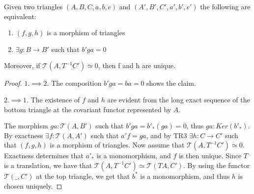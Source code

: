     \begin{lemma}
        Given two triangles $(A,B,C,a,b,c)$ and $(A',B',C',a',b',c')$ the following are equivalent:
        \begin{center}
            \begin{minipage}[c]{0.4\textwidth}
            \end{minipage}
            \begin{minipage}[c]{0.5\textwidth}
                \begin{enumerate}
                    \item $(f,g,h)$ is a morphism of triangles
                    \item $\exists g:B\rightarrow B'$ such that $b'ga = 0$
                \end{enumerate}
            \end{minipage}
        \end{center}
        Moreover, if $\mathcal{T}(A,T^{-1}C')\simeq 0$, then f and h are unique.
    \end{lemma}

    \begin{proof}
        $1. \implies 2.$ The composition $b'ga = ba = 0$ shows the claim. 
        
        $2. \implies 1.$ The existence of $f$ and $h$ are  evident from the long exact sequence of the bottom triangle at the covariant functor represented by $A$. 
        \begin{center}
        \end{center}
         The morphism $ga:\mathcal{T}(A,B')$ such that $b'ga=b'_*(ga)=0$, thus $ga:Ker(b'_*)$. By exactness $\exists f:\mathcal{T}(A,A')$ such that $a'f = ga$, and by TR3 $\exists h: C \rightarrow C'$ such that $(f,g,h)$ is a morphism of triangles.
        Now assume that $\mathcal{T}(A,T^{-1}C')\simeq 0$. Exactness determines that $a'_*$ is a monomorphism, and $f$ is then unique. Since $T$ is a translation, we have that $\mathcal{T}(A,T^{-1}C')\simeq\mathcal{T}(TA,C')$. By using the functor $\mathcal{T}(\_,C')$ at the top triangle, we get that $b^*$ is a monomorphism, and thus $h$ is chosen uniquely.
    \end{proof}

